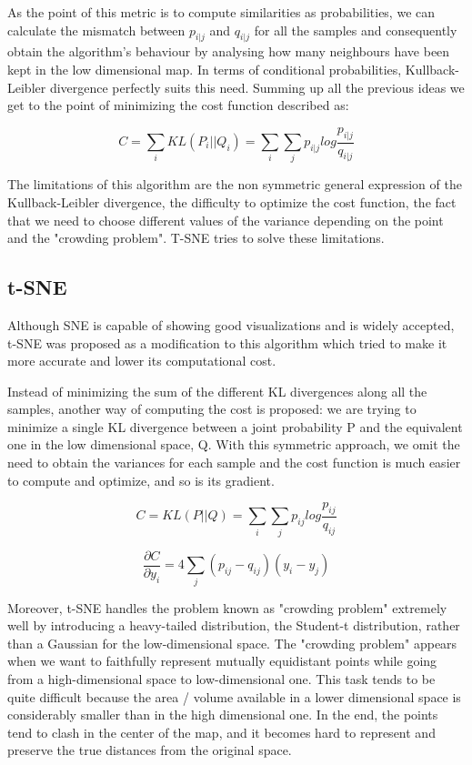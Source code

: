 \documentclass[a4paper,11pt,spanish]{report}
\begin{document}
As the point of this metric is to compute similarities as probabilities, we can calculate the mismatch between $p_{i|j}$ and $q_{i|j}$ for all the samples and consequently obtain the algorithm's behaviour by analysing how many neighbours have been kept in the low dimensional map. In terms of conditional probabilities, Kullback-Leibler divergence perfectly suits this need. Summing up all the previous ideas we get to the point of minimizing the cost function described as:

$$ C = \sum\limits_{i} KL(P_{i}||Q_{i}) = \sum\limits_{i} \sum\limits_{j} p_{i|j} log \frac{p_{i|j}}{q_{i|j}}$$

The limitations of this algorithm are the non symmetric general expression of the Kullback-Leibler divergence, the difficulty to optimize the cost function, the fact that we need to choose different values of the variance depending on the point and the "crowding problem". T-SNE tries to solve these limitations.

\subsection{t-SNE}
\label{ssec:tsne}

Although SNE is capable of showing good visualizations and is widely accepted, t-SNE was proposed as a modification to this algorithm which tried to make it more accurate and lower its computational cost.

Instead of minimizing the sum of the different KL divergences along all the samples, another way of computing the cost is proposed: we are trying to minimize a single KL divergence between a joint probability P and the equivalent one in the low dimensional space, Q. With this symmetric approach, we omit the need to obtain the variances for each sample and the cost function is much easier to compute and optimize, and so is its gradient.

$$ C = KL(P||Q) = \sum\limits_{i} \sum\limits_{j} p_{ij} log \frac{p_{ij}}{q_{ij}}$$

$$ \frac{\partial C}{\partial y_{i}} = 4 \sum\limits_j (p_{ij} - q_{ij}) (y_{i} - y_{j}) $$

Moreover, t-SNE handles the problem known as "crowding problem" extremely well by introducing a heavy-tailed distribution, the Student-t distribution, rather than a Gaussian for the low-dimensional space. The "crowding problem" appears when we want to faithfully represent mutually equidistant points while going from a high-dimensional space to low-dimensional one. This task tends to be quite difficult because the area / volume available in a lower dimensional space is considerably smaller than in the high dimensional one. In the end, the points tend to clash in the center of the map, and it becomes hard to represent and preserve the true distances from the original space.
\end{document}
